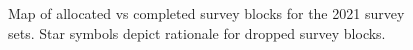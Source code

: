 \documentclass[12pt]{article}\usepackage[]{graphicx}\usepackage[]{color}
\begin{document}
\begin{figure}[htb]

{\centering {} 

}

\caption{Map of allocated vs completed survey blocks for the 2021 survey sets. Star symbols depict rationale for dropped survey blocks.}\label{fig:figure6}
\end{figure}
\clearpage

\clearpage
\end{document}
